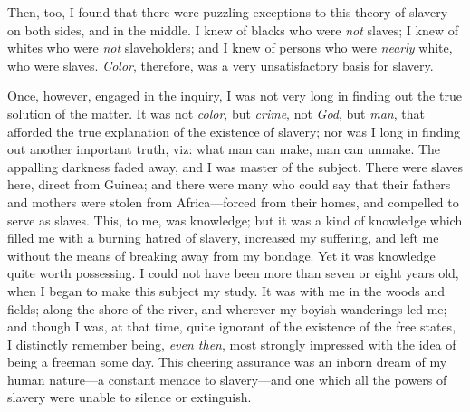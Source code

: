 Then, too, I found that there were puzzling exceptions to this theory of
slavery on both sides, and in the middle. I knew of blacks who were
\emph{not} slaves; I knew of whites who were \emph{not} slaveholders;
and I knew of persons who were \emph{nearly} white, who were slaves.
\emph{Color}, therefore, was a very unsatisfactory basis for slavery.

Once, however, engaged in the inquiry, I was not very long in finding
out the true solution of the matter. It was not \emph{color}, but
\emph{crime}, not \emph{God}, but \emph{man}, that afforded the true
explanation of the existence of slavery; nor was I long in finding out
another important truth, viz: what man can make, man can unmake. The
appalling darkness faded away, and I was master of the subject. There
were slaves here, {}direct from Guinea; and there were many who could
say that their fathers and mothers were stolen from Africa---forced from
their homes, and compelled to serve as slaves. This, to me, was
knowledge; but it was a kind of knowledge which filled me with a burning
hatred of slavery, increased my suffering, and left me without the means
of breaking away from my bondage. Yet it was knowledge quite worth
possessing. I could not have been more than seven or eight years old,
when I began to make this subject my study. It was with me in the woods
and fields; along the shore of the river, and wherever my boyish
wanderings led me; and though I was, at that time, quite ignorant of the
existence of the free states, I distinctly remember being, \emph{even
then}, most strongly impressed with the idea of being a freeman some
day. This cheering assurance was an inborn dream of my human nature---a
constant menace to slavery---and one which all the powers of slavery
were unable to silence or extinguish.

